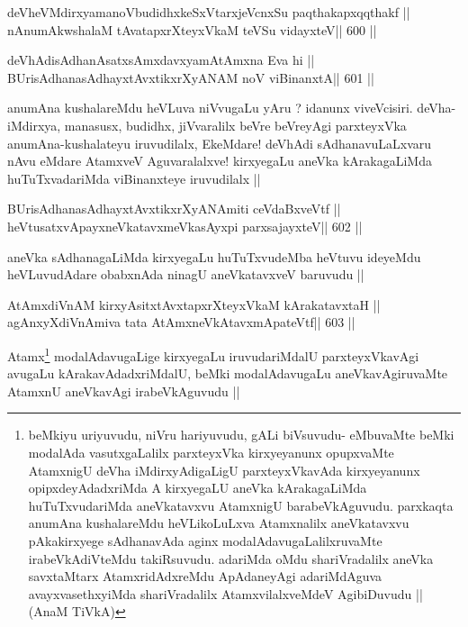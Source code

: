 \begin{shl}
deVheVMdirxyamanoVbudidhxkeSxVtarxjeVcnxSu paqthakapxqqthakf ||
nAnumAkwshalaM tAvatapxrXteyxVkaM teVSu vidayxteV\hfill || 600 ||
\end{shl}

\begin{shl}
deVhAdisAdhanAsatxsAmxdavxyamAtAmxna Eva hi ||
BUrisAdhanasAdhayxtAvxtikxrXyANAM noV viBinanxtA\hfill || 601 ||
\end{shl}

\begin{artha}
anumAna kushalareMdu heVLuva niVvugaLu yAru ? idanunx viveVcisiri.
deVha-iMdirxya, manasusx, budidhx, jiVvaralilx beVre beVreyAgi
parxteyxVka anumAna-kushalateyu iruvudilalx, EkeMdare! deVhAdi
sAdhanavuLaLxvaru nAvu eMdare AtamxveV Aguvaralalxve! kirxyegaLu
aneVka kArakagaLiMda huTuTxvadariMda viBinanxteye iruvudilalx ||
\end{artha}

\begin{shl}
BUrisAdhanasAdhayxtAvxtikxrXyANAmiti ceVdaBxveVtf ||
heVtusatxvApayxneVkatavxmeVkasAyxpi parxsajayxteV\hfill || 602 ||
\end{shl}

\begin{artha}
aneVka sAdhanagaLiMda kirxyegaLu huTuTxvudeMba heVtuvu ideyeMdu
heVLuvudAdare obabxnAda ninagU aneVkatavxveV baruvudu ||
\end{artha}



\begin{shl}
AtAmxdiVnAM kirxyAsitxtAvxtapxrXteyxVkaM kArakatavxtaH ||
agAnxyXdiVnAmiva tata AtAmxneVkAtavxmApateVtf\hfill || 603 ||
\end{shl}

\begin{artha}
Atamx\footnote[1]{beMkiyu uriyuvudu, niVru hariyuvudu, gALi biVsuvudu-
  eMbuvaMte beMki modalAda vasutxgaLalilx parxteyxVka kirxyeyanunx
  opupxvaMte AtamxnigU deVha iMdirxyAdigaLigU parxteyxVkavAda
  kirxyeyanunx opipxdeyAdadxriMda A kirxyegaLU aneVka kArakagaLiMda
  huTuTxvudariMda aneVkatavxvu AtamxnigU barabeVkAguvudu. parxkaqta
  anumAna kushalareMdu heVLikoLuLxva Atamxnalilx aneVkatavxvu
  pAkakirxyege sAdhanavAda aginx modalAdavugaLalilxruvaMte
  irabeVkAdiVteMdu takiRsuvudu. adariMda oMdu shariVradalilx aneVka
  savxtaMtarx AtamxridAdxreMdu ApAdaneyAgi adariMdAguva
  avayxvasethxyiMda shariVradalilx AtamxvilalxveMdeV AgibiDuvudu || 
  (AnaM TiVkA)} modalAdavugaLige kirxyegaLu iruvudariMdalU
parxteyxVkavAgi avugaLu kArakavAdadxriMdalU, beMki modalAdavugaLu
aneVkavAgiruvaMte AtamxnU aneVkavAgi irabeVkAguvudu ||
\end{artha}


